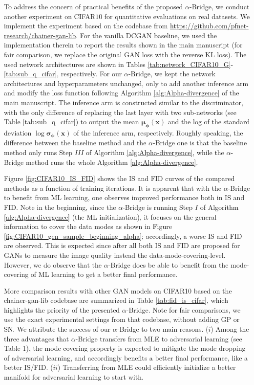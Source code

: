 \documentclass[letterpaper]{article} %
\newcommand{\xv}[0]{\ensuremath{\boldsymbol{x}} }
\newcommand{\muv}[0]{\ensuremath{\boldsymbol{\mu}} }
\newcommand{\sigmav}[0]{\ensuremath{\boldsymbol{\sigma}} }
\newcommand{\phiv}[0]{\ensuremath{\boldsymbol{\phi}} }
\begin{document}
To address the concern of practical benefits of the proposed $\alpha$-Bridge, we conduct another experiment on CIFAR$10$ \cite{krizhevsky2009learning} for quantitative evaluations on real datasets.
We implement the experiment based on the codebase from \url{https://github.com/pfnet-research/chainer-gan-lib}.
For the vanilla DCGAN baseline, we used the implementation therein to report the results shown in the main manuscript (for fair comparison, we replace the original GAN loss with the reverse KL loss). The used network architectures are shown in Tables \ref{tab:network_CIFAR10_G}-\ref{tab:sub_q_cifar}, respectively.
For our $\alpha$-Bridge, we kept the network architectures and hyperparameters unchanged, only to add another inference arm and modify the loss function following Algorithm \ref{alg:Alpha-divergence} of the main manuscript. The inference arm is constructed similar to the discriminator, with the only difference of replacing the last layer with two sub-networks (see Table \ref{tab:sub_q_cifar}) to output the mean $\muv_{\phiv}(\xv)$ and the log of the standard deviation $\log\sigmav_{\phiv}(\xv)$ of the inference arm, respectively. Roughly speaking, the difference between the baseline method and the $\alpha$-Bridge one is that the baseline method only runs Step $I\!I\!I$ of Algorithm \ref{alg:Alpha-divergence}, while the $\alpha$-Bridge method runs the whole Algorithm \ref{alg:Alpha-divergence}.


Figure \ref{fig:CIFAR10_IS_FID} shows the IS and FID curves of the compared methods as a function of training iterations. It is apparent that with the $\alpha$-Bridge to benefit from ML learning, one observes improved performance both in IS and FID. Note in the beginning, since the $\alpha$-Bridge is running Step $I$ of Algorithm \ref{alg:Alpha-divergence} (the ML initialization), it focuses on the general information to cover the data modes as shown in Figure \ref{fig:CIFAR10_gen_sample_beginning_alpha}; accordingly, a worse IS and FID are observed. This is expected since after all both IS and FID are proposed for GANs to measure the image quality instead the data-mode-covering-level. However, we do observe that the $\alpha$-Bridge does be able to benefit from the mode-covering of ML learning to get a better final performance. 

More comparison results with other GAN models on CIFAR10 based on the chainer-gan-lib codebase are summarized in Table \ref{tab:fid_is_cifar}, which highlights the priority of the presented $\alpha$-Bridge. Note for fair comparisons, we use the exact experimental settings from that codebase, without adding GP or SN. 
We attribute the success of our $\alpha$-Bridge to two main reasons. ($i$) Among the three advantages that $\alpha$-Bridge transfers from MLE to adversarial learning (see Table 1), the mode covering property is expected to mitigate the mode dropping of adversarial learning, and accordingly benefits a better final performance, like a better IS/FID. ($ii$) Transferring from MLE could efficiently initialize a better manifold for adversarial learning to start with. 
\end{document}
